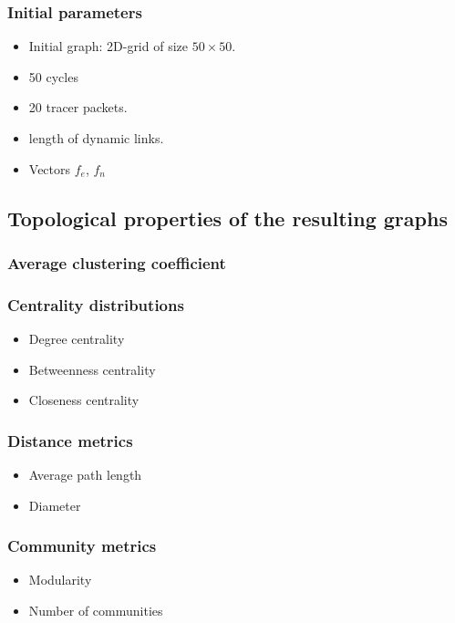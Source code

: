 \subsubsection{Initial parameters}

\begin{itemize}
	\item Initial graph: 2D-grid of size $50\times 50$.
	\item 50 cycles
	\item 20 tracer packets.
	\item length of dynamic links.
	\item Vectors $f_e$, $f_n$
\end{itemize}


\subsection{Topological properties of the resulting graphs}

\subsubsection{Average clustering coefficient}

\subsubsection{Centrality distributions}
\begin{itemize}
	\item Degree centrality
	\item Betweenness centrality
	\item Closeness centrality
\end{itemize}

\subsubsection{Distance metrics}
\begin{itemize}
	\item Average path length
	\item Diameter
\end{itemize}

\subsubsection{Community metrics}
\begin{itemize}
	\item Modularity
	\item Number of communities
\end{itemize}

